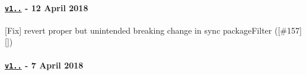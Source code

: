 \paragraph*{\href{https://github.com/browserify/resolve/compare/v1.7.0...v1.7.1}{\tt v1..} -\/ 12 April 2018}


\begin{DoxyItemize}
\item \mbox{[}Fix\mbox{]} revert proper but unintended breaking change in sync package\+Filter (\mbox{[}{\ttfamily \#157}\mbox{]}\mbox{[}\mbox{]})
\end{DoxyItemize}

\paragraph*{\href{https://github.com/browserify/resolve/compare/v1.6.0...v1.7.0}{\tt v1..} -\/ 7 April 2018}


